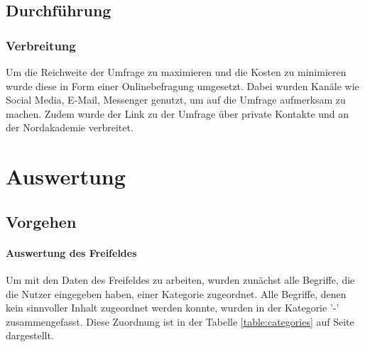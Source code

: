 \documentclass[a4paper]{article}
\begin{document}
		\subsection{Durchführung}
            \subsubsection{Verbreitung}
                Um die Reichweite der Umfrage zu maximieren und die Kosten zu minimieren wurde diese in Form einer Onlinebefragung umgesetzt. Dabei wurden Kanäle wie Social Media, E-Mail, Messenger genutzt, um auf die Umfrage aufmerksam zu machen. Zudem wurde der Link zu der Umfrage über private Kontakte und an der Nordakademie verbreitet.
                
    \section{Auswertung}
        \subsection{Vorgehen}
            
            \paragraph{Auswertung des Freifeldes}
                Um mit den Daten des Freifeldes zu arbeiten, wurden zunächst alle Begriffe, die die Nutzer eingegeben haben, einer Kategorie zugeordnet. Alle Begriffe, denen kein sinnvoller Inhalt zugeordnet werden konnte, wurden in der Kategorie '-' zusammengefasst. Diese Zuordnung ist in der Tabelle \ref{table:categories} auf Seite \pageref{table:categories} dargestellt.
            
\end{document}
